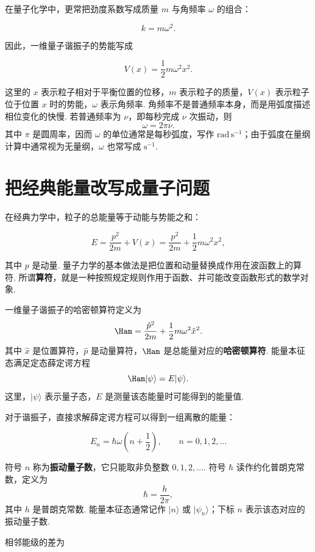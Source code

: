 \documentclass[UTF8,11pt,a4paper,openany]{ctexbook}
\newcommand{\ket}[1]{\lvert #1\rangle}\newcommand{\bra}[1]{\langle #1\rvert}
\newcommand{\term}[1]{\textbf{#1}}
\begin{document}
在量子化学中，更常把劲度系数写成质量 $m$ 与角频率 $\omega$ 的组合：

\[
k=m\omega^2.
\]

因此，一维量子谐振子的势能写成

\[
V(x)=\frac12m\omega^2x^2.
\]

\begin{notationbox}
这里的 $x$ 表示粒子相对于平衡位置的位移，$m$ 表示粒子的质量，$V(x)$ 表示粒子位于位置 $x$ 时的势能，$\omega$ 表示角频率. 角频率不是普通频率本身，而是用弧度描述相位变化的快慢. 若普通频率为 $\nu$，即每秒完成 $\nu$ 次振动，则
\[
\omega=2\pi\nu.
\]
其中 $\pi$ 是圆周率，因而 $\omega$ 的单位通常是每秒弧度，写作 $\mathrm{rad\,s^{-1}}$；由于弧度在量纲计算中通常视为无量纲，$\omega$ 也常写成 $\mathrm{s^{-1}}$. 
\end{notationbox}

\section{把经典能量改写成量子问题}

在经典力学中，粒子的总能量等于动能与势能之和：

\[
E=\frac{p^2}{2m}+V(x)
=\frac{p^2}{2m}+\frac12m\omega^2x^2,
\]

其中 $p$ 是动量. 量子力学的基本做法是把位置和动量替换成作用在波函数上的算符. 所谓\term{算符}，就是一种按照规定规则作用于函数、并可能改变函数形式的数学对象. 

\begin{definitionbox}
一维量子谐振子的哈密顿算符定义为
\[
\Ham=\frac{\hat p^2}{2m}+\frac12m\omega^2\hat x^2.
\]
其中 $\hat x$ 是位置算符，$\hat p$ 是动量算符，$\Ham$ 是总能量对应的\term{哈密顿算符}. 能量本征态满足定态薛定谔方程
\[
\Ham\ket{\psi}=E\ket{\psi}.
\]
这里，$\ket{\psi}$ 表示量子态，$E$ 是测量该态能量时可能得到的能量值. 
\end{definitionbox}

对于谐振子，直接求解薛定谔方程可以得到一组离散的能量：

\[
E_n=\hbar\omega\left(n+\frac12\right),
\qquad n=0,1,2,\ldots
\]

\begin{notationbox}
符号 $n$ 称为\term{振动量子数}，它只能取非负整数 $0,1,2,\ldots$. 符号 $\hbar$ 读作约化普朗克常数，定义为
\[
\hbar=\frac{h}{2\pi},
\]
其中 $h$ 是普朗克常数. 能量本征态通常记作 $\ket n$ 或 $\ket{\psi_n}$；下标 $n$ 表示该态对应的振动量子数. 
\end{notationbox}

相邻能级的差为
\end{document}

